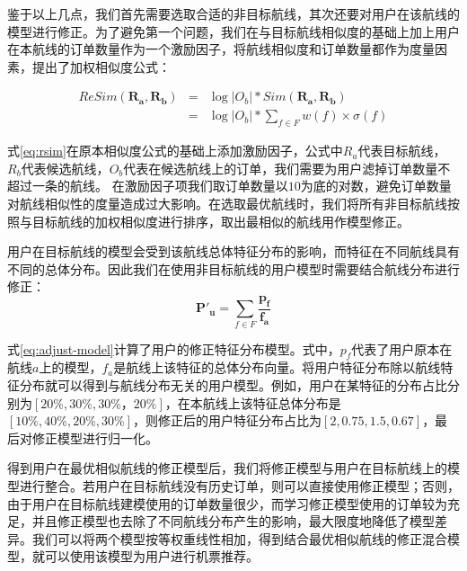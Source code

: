 鉴于以上几点，我们首先需要选取合适的非目标航线，其次还要对用户在该航线的模型进行修正。为了避免第一个问题，我们在与目标航线相似度的基础上加上用户在本航线的订单数量作为一个激励因子，将航线相似度和订单数量都作为度量因素，提出了加权相似度公式：

\begin{eqnarray}
\label{eq:rsim}
	ReSim(\mathbf{R_a,R_b}) & = & \log{|O_b|} * Sim(\mathbf{R_a,R_b})  \nonumber \\
                        & = & \log{|O_b|} * \sum_{f \in F}w(f) \times \sigma(f)
\end{eqnarray}

式\ref{eq:rsim}在原本相似度公式的基础上添加激励因子，公式中$R_a$代表目标航线，$R_b$代表候选航线，$O_b$代表在候选航线上的订单，我们需要为用户滤掉订单数量不超过一条的航线。
在激励因子项我们取订单数量以$10$为底的对数，避免订单数量对航线相似性的度量造成过大影响。在选取最优航线时，我们将所有非目标航线按照与目标航线的加权相似度进行排序，取出最相似的航线用作模型修正。

用户在目标航线的模型会受到该航线总体特征分布的影响，而特征在不同航线具有不同的总体分布。因此我们在使用非目标航线的用户模型时需要结合航线分布进行修正：
\begin{equation}
\label{eq:adjust-model}
	\mathbf{P'_u} = \sum_{f \in F} \frac{\mathbf{p_f}}{\mathbf{f_a}}
\end{equation}

式\ref{eq:adjust-model}计算了用户的修正特征分布模型。式中，$p_f$代表了用户原本在航线$a$上的模型，$f_a$是航线上该特征的总体分布向量。将用户特征分布除以航线特征分布就可以得到与航线分布无关的用户模型。例如，用户在某特征的分布占比分别为$[20\%,30\%,30\%，20\%]$，在本航线上该特征总体分布是$[10\%,40\%,20\%,30\%]$，则修正后的用户特征分布占比为$[2,0.75,1.5,0.67]$，最后对修正模型进行归一化。

得到用户在最优相似航线的修正模型后，我们将修正模型与用户在目标航线上的模型进行整合。若用户在目标航线没有历史订单，则可以直接使用修正模型；否则，由于用户在目标航线建模使用的订单数量很少，而学习修正模型使用的订单较为充足，并且修正模型也去除了不同航线分布产生的影响，最大限度地降低了模型差异。我们可以将两个模型按等权重线性相加，得到结合最优相似航线的修正混合模型，就可以使用该模型为用户进行机票推荐。

